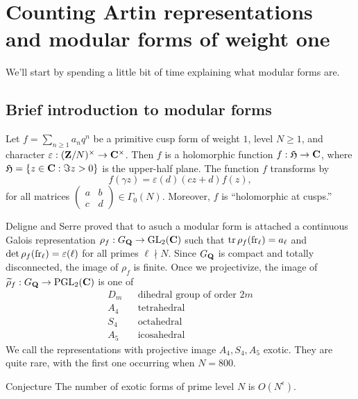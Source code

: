
\section{Counting Artin representations and modular forms of weight one}





We'll start by spending a little bit of time explaining what modular forms are. 





\subsection{Brief introduction to modular forms}

Let $f = \sum_{n\geqslant 1} a_n q^n$ be a primitive cusp form of weight $1$, 
level $N\geqslant 1$, and character 
$\varepsilon:(\mathbf{Z}/N)^\times \to \mathbf{C}^\times$. Then $f$ is a holomorphic function 
$f:\mathfrak{H}\to \mathbf{C}$, where $\mathfrak{H}=\{z\in \mathbf{C}:\Im z>0\}$ is the upper-half plane. The 
function $f$ transforms by 
\[
  f(\gamma z) = \varepsilon(d) (c z+d) f(z) ,
\]
for all matrices $\begin{pmatrix} a & b \\ c & d \end{pmatrix}\in \Gamma_0(N)$. 
Moreover, $f$ is ``holomorphic at cusps.'' 

Deligne and Serre proved that to asuch a modular form is attached a continuous 
Galois representation $\rho_f:G_{\mathbf{Q}} \to \operatorname{GL}_2(\mathbf{C})$ such that 
$\operatorname{tr} \rho_f(\operatorname{fr}_\ell) = a_\ell$ and 
$\det\rho_f(\operatorname{fr}_\ell) = \varepsilon(\ell)$ for all primes $\ell\nmid N$. 
Since $G_{\mathbf{Q}}$ is compact and totally disconnected, the image of $\rho_f$ is 
finite. Once we projectivize, the image of 
$\widetilde\rho_f:G_{\mathbf{Q}}\to \operatorname{PGL}_2(\mathbf{C})$ is one of 
\begin{align*}
  D_m && \text{dihedral group of order }2m \\
  A_4 && \text{tetrahedral} \\
  S_4 && \text{octahedral} \\
  A_5 && \text{icosahedral}
\end{align*}
We call the representations with projective image $A_4,S_4,A_5$ exotic. They 
are quite rare, with the first one occurring when $N=800$. 

\begin{enonce}{Conjecture}
The number of exotic forms of prime level $N$ is $O(N^\epsilon)$. 
\end{enonce}

